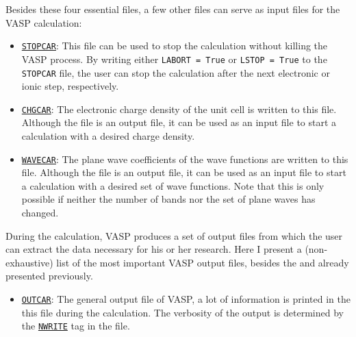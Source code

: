\begin{refsection}
\begin{itemize}
\end{itemize}

Besides these four essential files, a few other files can serve as input files 
for the VASP calculation:

\begin{itemize}

 \label{appendix:sec-STOPCAR} 
\item \href{https://www.vasp.at/wiki/index.php/STOPCAR}{\texttt{STOPCAR}}:
This file can be used to stop the calculation without killing the VASP 
process. By writing either \texttt{LABORT = True} or \texttt{LSTOP = True} to 
the \texttt{STOPCAR} file, the user can stop the calculation after the next 
electronic or ionic step, respectively.

 \label{appendix:sec-CHGCAR} 
\item \href{https://www.vasp.at/wiki/index.php/CHGCAR}{\texttt{CHGCAR}}: 
The electronic charge density of the unit cell is written to this file. 
Although the file is an output file, it can be used as an input file to 
start a calculation with a desired charge density.

 \label{appendix:sec-WAVECAR} 
\item \href{https://www.vasp.at/wiki/index.php/WAVECAR}{\texttt{WAVECAR}}: 
The plane wave coefficients of the wave functions are written to this file. 
Although the file is an output file, it can be used as an input file to 
start a calculation with a desired set of wave functions. Note that this 
is only possible if neither the number of bands nor the set of plane waves 
has changed.

\end{itemize} 

During the calculation, VASP produces a set of output files from which the 
user can extract the data necessary for his or her research. Here I present a  
(non-exhaustive) list of the most important VASP output files, besides the 
 and  already presented previously.
 
\begin{itemize} 
 
 \label{appendix:sec-OUTCAR} 
\item \href{https://www.vasp.at/wiki/index.php/OUTCAR}{\texttt{OUTCAR}}: 
The general output file of VASP, a lot of information is printed in the this 
file during the calculation. The verbosity of the output is determined by the 
\href{https://www.vasp.at/wiki/index.php/NWRITE}{\texttt{NWRITE}} tag in the 
 file. 


\end{itemize}
\end{refsection}
